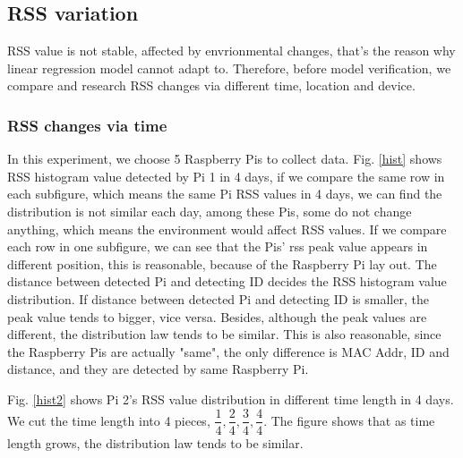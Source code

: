 \documentclass[10pt,conference]{IEEEtran}
\begin{document}
\subsection{RSS variation}
RSS value is not stable, affected by envrionmental changes, that's the reason why linear regression model cannot adapt to. Therefore, before model verification, we compare and research RSS changes via different time, location and device.


\subsubsection{RSS changes via time}
In this experiment, we choose 5 Raspberry Pis to collect data. Fig. \ref{hist} shows RSS histogram value detected by Pi 1 in 4 days, if we compare the same row in each subfigure, which means the same Pi RSS values in 4 days, we can find the distribution is not similar each day, among these Pis, some do not change anything, which means the environment would affect RSS values.
If we compare each row in one subfigure, we can see that the Pis' rss peak value appears in different position, this is reasonable, because of the Raspberry Pi lay out. The distance between detected Pi and detecting ID decides the RSS histogram value distribution. If distance between detected Pi and detecting ID is smaller, the peak value tends to bigger, vice versa. Besides, although the peak values are different, the distribution law tends to be similar. This is also reasonable, since the Raspberry Pis are actually "same", the only difference is MAC Addr, ID and distance, and they are detected by same Raspberry Pi.

Fig. \ref{hist2} shows Pi 2's RSS value distribution in different time length in 4 days. We cut the time length into 4 pieces, $\dfrac{1}{4},\dfrac{2}{4}, \dfrac{3}{4}, \dfrac{4}{4}$. The figure shows that as time length grows, the distribution law tends to be similar.



\end{document}
